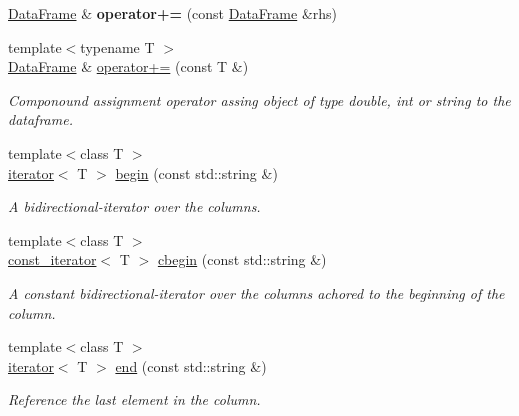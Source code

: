 \begin{DoxyCompactItemize}
\mbox{\label{classDataFrame_a61f3301cc72548b4b3536c0844fb156d}} 
\hyperlink{classDataFrame}{Data\+Frame} \& {\bfseries operator+=} (const \hyperlink{classDataFrame}{Data\+Frame} \&rhs)
\item 
\mbox{\label{classDataFrame_aa612c8755b333027d3cddc30a8e62386}} 
{\footnotesize template$<$typename T $>$ }\\\hyperlink{classDataFrame}{Data\+Frame} \& \hyperlink{classDataFrame_aa612c8755b333027d3cddc30a8e62386}{operator+=} (const T \&)
\begin{DoxyCompactList}\small\item\em Componound assignment operator assing object of type double, int or string to the dataframe. \end{DoxyCompactList}\item 
{\footnotesize template$<$class T $>$ }\\\hyperlink{classDataFrame_1_1iterator}{iterator}$<$ T $>$ \hyperlink{classDataFrame_abc7986e45f6c9fc145156965bcfd8e7f}{begin} (const std\+::string \&)
\begin{DoxyCompactList}\small\item\em A bidirectional-\/iterator over the columns. \end{DoxyCompactList}\item 
{\footnotesize template$<$class T $>$ }\\\hyperlink{classDataFrame_1_1const__iterator}{const\+\_\+iterator}$<$ T $>$ \hyperlink{classDataFrame_a2c869adf1441f604eaa1e629e7e8c8f4}{cbegin} (const std\+::string \&)
\begin{DoxyCompactList}\small\item\em A constant bidirectional-\/iterator over the columns achored to the beginning of the column. \end{DoxyCompactList}\item 
\mbox{\label{classDataFrame_a925a16eff1840c7711c5342a4fdfab0d}} 
{\footnotesize template$<$class T $>$ }\\\hyperlink{classDataFrame_1_1iterator}{iterator}$<$ T $>$ \hyperlink{classDataFrame_a925a16eff1840c7711c5342a4fdfab0d}{end} (const std\+::string \&)
\begin{DoxyCompactList}\small\item\em Reference the last element in the column. \end{DoxyCompactList}\item 

\end{DoxyCompactItemize}
